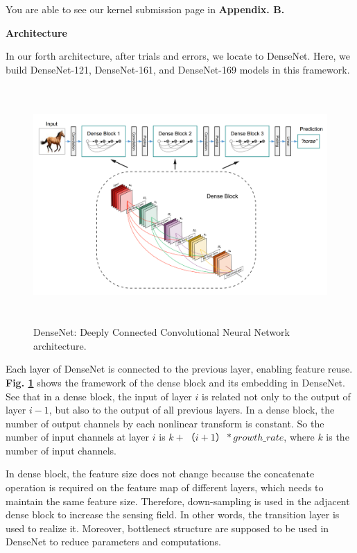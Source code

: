 \documentclass[a4paper]{article}
\begin{document}
\large{You are able to see our kernel submission page in \textbf{Appendix. B.}}

\vspace{2mm}
\begin{center}
\large\textbf{Architecture} \\
\end{center}


\large{
In our forth architecture, after trials and errors, we locate to \textsf{DenseNet}. Here, we build \textsf{DenseNet-121}, \textsf{DenseNet-161}, and \textsf{DenseNet-169} models in this framework.

\begin{figure}[h]
\centering
\includegraphics[width=15cm,height=9cm]{densenet.pdf}
\caption{\textsf{DenseNet}: Deeply Connected Convolutional Neural Network architecture.}
\label{densenetarch}
\end{figure}

Each layer of \textsf{DenseNet} is connected to the previous layer, enabling feature reuse. \textbf{Fig. \ref{densenetarch}} shows the framework of the dense block and its embedding in \textsf{DenseNet}. See that in a dense block, the input of layer $i$ is related not only to the output of layer $i-1$, but also to the output of all previous layers. In a dense block, the number of output channels by each nonlinear transform is constant. So the number of input channels at layer $i$ is $k+（i+1）* growth\_rate$, where $k$ is the number of input channels.

In dense block, the feature size does not change because the concatenate operation is required on the feature map of different layers, which needs to maintain the same feature size. Therefore, down-sampling is used in the adjacent dense block to increase the sensing field. In other words, the transition layer is used to realize it. Moreover, bottlenect structure are supposed to be used in \textsf{DenseNet} to reduce parameters and computations.

}
\end{document}
